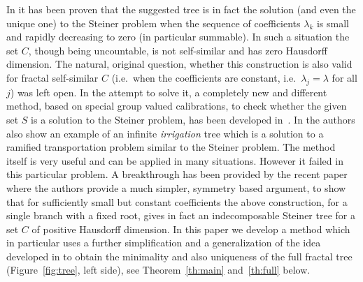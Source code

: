 \documentclass{amsart}
\theoremstyle{definition}
\theoremstyle{remark}
\begin{document}
In \cite{PaoSteTep15} it has been proven that 
the suggested tree is in fact the solution (and even the unique one) 
to the Steiner problem when the sequence of coefficients $\lambda_k$
is small and rapidly decreasing to zero (in particular summable).
In such a situation the set $C$, though being uncountable,
is not self-similar and has zero Hausdorff dimension.
The natural, original question, whether this construction is also valid 
for fractal self-similar $C$ (i.e.\ when the coefficients are constant,
i.e.\ $\lambda_j=\lambda$ for all $j$)
was left open.
In the attempt to solve it, a 
completely new and different method, based on special group valued calibrations,
to check whether the given set $S$ is a solution to the Steiner problem,
has been developed in~\cite{MarMas16a}.
In \cite{MarMas16b} the authors also show an example 
of an infinite \emph{irrigation} tree which is a solution to
a ramified transportation problem similar to the Steiner problem.
The method itself is very useful and can be applied in many situations.
However it failed in this particular problem.
A breakthrough has been provided by the recent paper \cite{CheTep23}
where the authors provide a much simpler, symmetry based argument, to show that for 
sufficiently small but constant coefficients the above construction,
for a single branch with a fixed root,
gives in fact an indecomposable Steiner tree for a set $C$ 
of positive Hausdorff dimension.
In this paper we develop a method which in particular uses 
a further simplification and a generalization of 
the idea developed in \cite{CheTep23} to obtain the minimality and also uniqueness 
of the full fractal tree (Figure~\ref{fig:tree}, left side), 
see Theorem~\ref{th:main} and~\ref{th:full} below.
\end{document}
